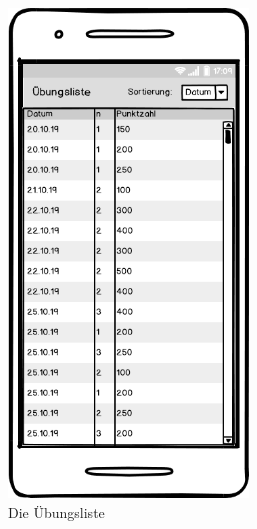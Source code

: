 \begin{figure}[htbp]
\begin{subfigure}{.33\textwidth}
  \includegraphics[width=0.7\textwidth]{img/list.png}
  \caption{Die Übungsliste}
\end{subfigure}
\begin{subfigure}{.33\textwidth}
  \centering

\end{subfigure}
\end{figure}
